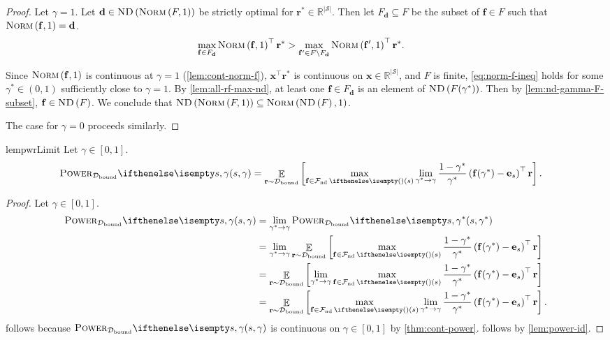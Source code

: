 \documentclass{article}
\renewcommand{\abs}[1]{\left|#1\right|}
\newcommand*{\prn}[1]{\left(#1\right)}
\newcommand*{\brx}[1]{\left[#1\right]}
\newcommand*{\x}{\mathbf{x}} %
\newcommand*{\reals}{\mathbb{R}}
\newcommand*{\unitvec}[1][s]{\mathbf{e}_{#1}}
\newcommand*{\upsc}[1]{\text{\upshape\textsc{#1}}}
\newcommand*{\St}{\mathcal{S}}
\newcommand*{\rf}{\mathbf{r}} %
\newcommand*{\rewardVS}{\reals^{\abs{\St}}} %
\newcommand*{\D}{\mathcal{D}} %
\newcommand*{\Dbd}{\D_{\text{bound}}}
\DeclareMathOperator*{\opE}{\mathbb{E}}
\newcommand*{\E}[2]{\opE_{#1}\brx{#2}} %
\newcommand*{\f}{\mathbf{f}} %
\newcommand*{\ND}[1]{\upsc{ND}\prn{#1}}
\newcommand*{\NormF}[1]{\upsc{Norm}\prn{#1}}
\newcommand*{\dbf}{\mathbf{d}} %
\theoremstyle{definition}
\begin{document}
\begin{appendices}
\begin{proof}
Let $\gamma=1$. Let $\dbf \in \ND{\NormF{F,1}}$ be strictly optimal for $\rf^*\in\rewardVS$. Then let $F_\dbf \subseteq F$ be the subset of $\f\in F$ such that $\NormF{\f,1}=\dbf$. 
\begin{align}
    \max_{\f\in F_\dbf} \NormF{\f,1}^\top \rf^* & > \max_{\f'\in F\setminus F_\dbf} \NormF{\f',1}^\top \rf^*.\label{eq:norm-f-ineq}
\end{align}

Since $\NormF{\f,1}$ is continuous at $\gamma=1$ (\cref{lem:cont-norm-f}), $\x^\top \rf^*$ is continuous on $\x\in\rewardVS$, and $F$ is finite, \cref{eq:norm-f-ineq} holds for some $\gamma^*\in(0,1)$ sufficiently close to $\gamma=1$. By \cref{lem:all-rf-max-nd}, at least one $\f\in F_\dbf$ is an element of $\ND{F(\gamma^*)}$. Then by \cref{lem:nd-gamma-F-subset}, $\f\in\ND{F}$. We conclude that $\ND{\NormF{F,1}}\subseteq \NormF{\ND{F},1}$. 

The case for $\gamma=0$ proceeds similarly.
\end{proof}

\begin{restatable}{lem}{pwrLimit}\label{lem:pwr-limit}
Let $\gamma\in[0,1]$.
\begin{align}
    \pwr[s,\gamma]&=\E{\rf\sim\Dbd}{\max_{\f\in \Fnd(s)} \lim_{\gamma^*\to\gamma}\frac{1-\gamma^*}{\gamma^*}\prn{\f(\gamma^*)-\unitvec}^\top \rf}.
\end{align}
\end{restatable}
\begin{proof}
Let $\gamma\in[0,1]$.
\begin{align}
    \pwr[s,\gamma]&= \lim_{\gamma^*\to\gamma}\pwr[s,\gamma^*]\label{eq:pwr-cont-lim}\\
    &=\lim_{\gamma^*\to\gamma} \E{\rf\sim\Dbd}{\max_{\f\in \Fnd(s)} \frac{1-\gamma^*}{\gamma^*}\prn{\f(\gamma^*)-\unitvec}^\top \rf}\label{eq:pwr-lim-def}\\
    &=\E{\rf\sim\Dbd}{\lim_{\gamma^*\to\gamma}\max_{\f\in \Fnd(s)} \frac{1-\gamma^*}{\gamma^*}\prn{\f(\gamma^*)-\unitvec}^\top \rf}\label{eq:pwr-dom-conv}\\
    &=\E{\rf\sim\Dbd}{\max_{\f\in \Fnd(s)} \lim_{\gamma^*\to\gamma}\frac{1-\gamma^*}{\gamma^*}\prn{\f(\gamma^*)-\unitvec}^\top \rf}.\label{eq:max-cont-lim}
\end{align}
 follows because $\pwr[s,\gamma]$ is continuous on $\gamma\in[0,1]$ by \cref{thm:cont-power}.  follows by \cref{lem:power-id}. 


\end{proof}
\end{appendices}
\end{document}
